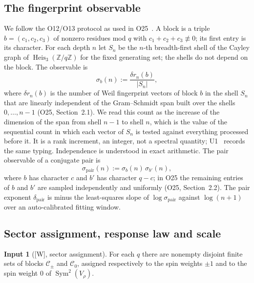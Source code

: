 \documentclass[12pt,a4paper]{article}
\theoremstyle{definition}
\newtheorem*{hypo}{Input}
\theoremstyle{remark}
\DeclareMathOperator{\Heis}{Heis}
\DeclareMathOperator{\Sym}{Sym}
\newcommand{\spair}{\sigma_{\mathrm{pair}}}
\newcommand{\dpair}{\delta_{\mathrm{pair}}}
\newcommand{\Cpm}{\mathcal{C}_{\pm}}
\newcommand{\Czero}{\mathcal{C}_{0}}
\begin{document}
    \subsection{The fingerprint observable}

      We follow the O12/O13 protocol as used in O25~\cite{Beau2026a29}.
      A block is a triple $b = (c_1, c_2, c_3)$ of nonzero residues mod $q$ with $c_1 + c_2 + c_3 \not\equiv 0$;
      its first entry is its character.
      For each depth $n$ let $S_n$ be the $n$-th breadth-first shell of the Cayley graph of
      $\Heis_3(\mathbb{Z}/q\mathbb{Z})$ for the fixed generating set; the shells do not depend on the block.
      The observable is
      \begin{equation}\label{eq:sigmac}
        \sigma_b(n) := \frac{\delta r_n(b)}{|S_n|},
      \end{equation}
      where $\delta r_n(b)$ is the number of Weil fingerprint vectors of block $b$ in the shell $S_n$ that are
      linearly independent of the Gram--Schmidt span built over the shells $0, \dots, n-1$ (O25, Section~2.1).
      We read this count as the increase of the dimension of the span from shell $n-1$ to shell $n$, which is the
      value of the sequential count in which each vector of $S_n$ is tested against everything processed before it.
      It is a rank increment, an integer, not a spectral quantity; U1~\cite{Beau2026u1} records the same typing.
      Independence is understood in exact arithmetic.
      The pair observable of a conjugate pair is
      \begin{equation}\label{eq:sigmapair}
        \spair(n) := \sigma_b(n)\,\sigma_{b'}(n),
      \end{equation}
      where $b$ has character $c$ and $b'$ has character $q - c$; in O25 the remaining entries of $b$ and $b'$ are
      sampled independently and uniformly (O25, Section~2.2).
      The pair exponent $\dpair$ is minus the least-squares slope of $\log \spair$ against $\log(n+1)$ over an
      auto-calibrated fitting window.

    \subsection{Sector assignment, response law and scale}

      \begin{hypo}[{[W]}, sector assignment]
        For each $q$ there are nonempty disjoint finite sets of blocks $\Cpm$ and $\Czero$, assigned respectively to
        the spin weights $\pm 1$ and to the spin weight $0$ of $\Sym^2(V_\rho)$.
      \end{hypo}
\end{document}
